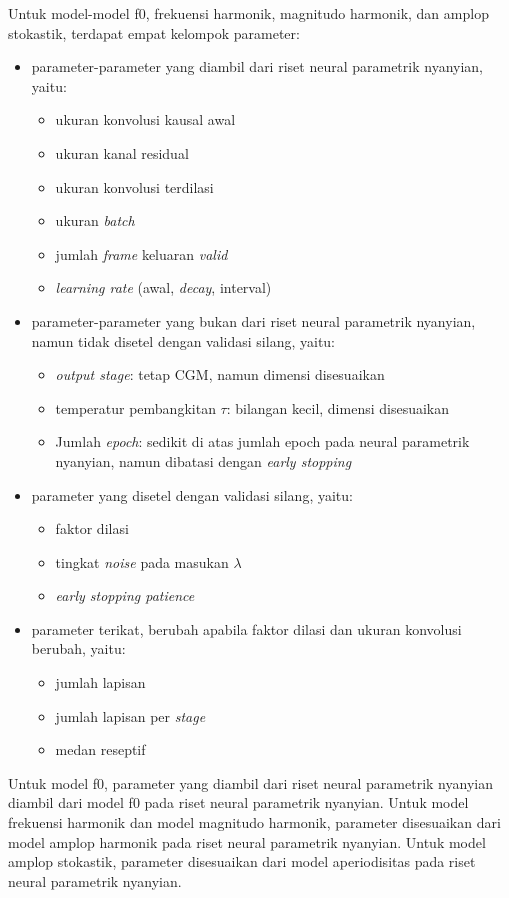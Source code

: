 Untuk model-model f0, frekuensi harmonik, magnitudo harmonik, dan amplop stokastik, terdapat empat kelompok parameter:
\begin{itemize}
	\item parameter-parameter yang diambil dari riset neural parametrik nyanyian, yaitu:
	\begin{itemize}
		\item ukuran konvolusi kausal awal
		\item ukuran kanal residual
		\item ukuran konvolusi terdilasi
		\item ukuran \textit{batch}
		\item jumlah \textit{frame} keluaran \textit{valid}
		\item \textit{learning rate} (awal, \textit{decay}, interval)
	\end{itemize}
	\item parameter-parameter yang bukan dari riset neural parametrik nyanyian, namun tidak disetel dengan validasi silang, yaitu:
	\begin{itemize}
		\item \textit{output stage}: tetap CGM, namun dimensi disesuaikan
		\item temperatur pembangkitan $\tau$: bilangan kecil, dimensi disesuaikan
		\item Jumlah \textit{epoch}: sedikit di atas jumlah epoch pada neural parametrik nyanyian, namun dibatasi dengan \textit{early stopping}
	\end{itemize}
	\item parameter yang disetel dengan validasi silang, yaitu:
	\begin{itemize}
		\item faktor dilasi
		\item tingkat \textit{noise} pada masukan $\lambda$
		\item \textit{early stopping patience}
	\end{itemize}
	\item parameter terikat, berubah apabila faktor dilasi dan ukuran konvolusi berubah, yaitu:
	\begin{itemize}
		\item jumlah lapisan
		\item jumlah lapisan per \textit{stage}
		\item medan reseptif
	\end{itemize}
\end{itemize}

Untuk model f0, parameter yang diambil dari riset neural parametrik nyanyian diambil dari model f0 pada riset neural parametrik nyanyian. Untuk model frekuensi harmonik dan model magnitudo harmonik, parameter disesuaikan dari model amplop harmonik pada riset neural parametrik nyanyian. Untuk model amplop stokastik, parameter disesuaikan dari model aperiodisitas pada riset neural parametrik nyanyian.

